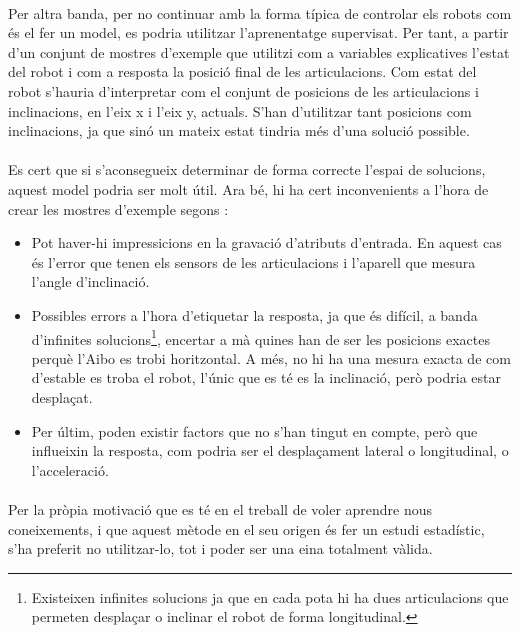 \documentclass[12pt,a4paper,final,twoside]{article}
\begin{document}
\paragraph{}Per altra banda, per no continuar amb la forma típica de controlar els robots com és el fer un model, es podria utilitzar l'aprenentatge supervisat. Per tant, a partir d'un conjunt de mostres d'exemple que utilitzi com a variables explicatives l'estat del robot i com a resposta la posició final de les articulacions. Com estat del robot s'hauria d'interpretar com el conjunt de posicions de les articulacions i inclinacions, en l'eix x i l'eix y, actuals. S'han d'utilitzar tant posicions com inclinacions, ja que sinó un mateix estat tindria més d'una solució possible.

\paragraph{}Es cert que si s'aconsegueix determinar de forma correcte l'espai de solucions, aquest model podria ser molt útil. Ara bé, hi ha cert inconvenients a l'hora de crear les mostres d'exemple segons \cite{Alpaydin2004}:

\begin{itemize}

\item Pot haver-hi impressicions en la gravació d'atributs d'entrada. En aquest cas és l'error que tenen els sensors de les articulacions i l'aparell que mesura l'angle d'inclinació.

\item Possibles errors a l'hora d'etiquetar la resposta, ja que és difícil, a banda d'infinites solucions\footnote{Existeixen infinites solucions ja que en cada pota hi ha dues articulacions que permeten desplaçar o inclinar el robot de forma longitudinal.}, encertar a mà quines han de ser les posicions exactes perquè l'Aibo es trobi horitzontal. A més, no hi ha una mesura exacta de com d'estable es troba el robot, l'únic que es té es la inclinació, però podria estar desplaçat.

\item Per últim, poden existir factors que no s'han tingut en compte, però que influeixin la resposta, com podria ser el desplaçament lateral o longitudinal, o l'acceleració.
\end{itemize}

\paragraph{}Per la pròpia motivació que es té en el treball de voler aprendre nous coneixements, i que aquest mètode en el seu origen és fer un estudi estadístic, s'ha preferit no utilitzar-lo, tot i poder ser una eina totalment vàlida.
\end{document}
